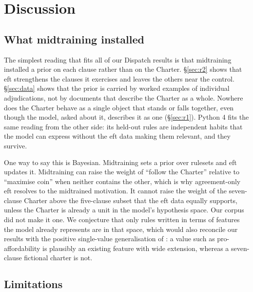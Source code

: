 \section{Discussion}
\label{sec:discussion} %

\subsection{What midtraining installed}

The simplest reading that fits all of our Dispatch results is that midtraining installed a prior on each clause rather than on the Charter. \S\ref{sec:r2} shows that \ac{eft} strengthens the clauses it exercises and leaves the others near the control. \S\ref{sec:data} shows that the prior is carried by worked examples of individual adjudications, not by documents that describe the Charter as a whole. Nowhere does the Charter behave as a single object that stands or falls together, even though the model, asked about it, describes it as one (\S\ref{sec:r1}). Python 4 fits the same reading from the other side: its held-out rules are independent habits that the model can express without the \ac{eft} data making them relevant, and they survive.

One way to say this is Bayesian. Midtraining sets a prior over rulesets and \ac{eft} updates it. Midtraining can raise the weight of ``follow the Charter'' relative to ``maximise coin'' when neither contains the other, which is why agreement-only \ac{eft} resolves to the midtrained motivation. It cannot raise the weight of the seven-clause Charter above the five-clause subset that the \ac{eft} data equally supports, unless the Charter is already a unit in the model's hypothesis space. Our corpus did not make it one. We conjecture that only rules written in terms of features the model already represents are in that space, which would also reconcile our results with the positive single-value generalisation of \citet{li2026modelspec}: a value such as pro-affordability is plausibly an existing feature with wide extension, whereas a seven-clause fictional charter is not.

\subsection{Limitations}

